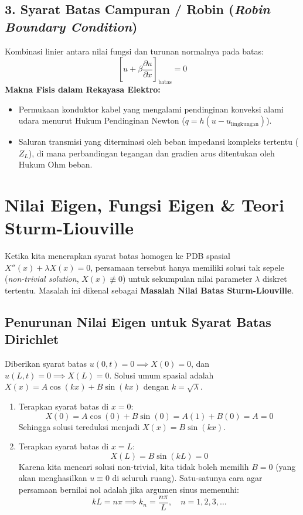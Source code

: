 \documentclass[11pt,a4paper]{article}
\theoremstyle{definition}
\begin{document}
\subsection{3. Syarat Batas Campuran / Robin (\textit{Robin Boundary Condition})}
Kombinasi linier antara nilai fungsi dan turunan normalnya pada batas:
\begin{equation}
    \left[ u + \beta \frac{\partial u}{\partial x} \right]_{\text{batas}} = 0
    \label{eq:bc_robin}
\end{equation}
\textbf{Makna Fisis dalam Rekayasa Elektro:}
\begin{itemize}[leftmargin=*]
    \item Permukaan konduktor kabel yang mengalami pendinginan konveksi alami udara menurut Hukum Pendinginan Newton ($q = h(u - u_{\text{lingkungan}})$).
    \item Saluran transmisi yang diterminasi oleh beban impedansi kompleks tertentu ($Z_L$), di mana perbandingan tegangan dan gradien arus ditentukan oleh Hukum Ohm beban.
\end{itemize}

\section{Nilai Eigen, Fungsi Eigen \& Teori Sturm-Liouville}

Ketika kita menerapkan syarat batas homogen ke PDB spasial $X''(x) + \lambda X(x) = 0$, persamaan tersebut hanya memiliki solusi tak sepele (\textit{non-trivial solution}, $X(x) \not\equiv 0$) untuk sekumpulan nilai parameter $\lambda$ diskret tertentu. Masalah ini dikenal sebagai \textbf{Masalah Nilai Batas Sturm-Liouville}.

\subsection{Penurunan Nilai Eigen untuk Syarat Batas Dirichlet}
Diberikan syarat batas $u(0, t) = 0 \implies X(0) = 0$, dan $u(L, t) = 0 \implies X(L) = 0$.
Solusi umum spasial adalah $X(x) = A \cos(kx) + B \sin(kx)$ dengan $k = \sqrt{\lambda}$.
\begin{enumerate}[leftmargin=*]
    \item Terapkan syarat batas di $x = 0$:
    \begin{equation*}
        X(0) = A \cos(0) + B \sin(0) = A(1) + B(0) = A = 0
    \end{equation*}
    Sehingga solusi tereduksi menjadi $X(x) = B \sin(kx)$.
    \item Terapkan syarat batas di $x = L$:
    \begin{equation*}
        X(L) = B \sin(kL) = 0
    \end{equation*}
    Karena kita mencari solusi non-trivial, kita tidak boleh memilih $B = 0$ (yang akan menghasilkan $u \equiv 0$ di seluruh ruang). Satu-satunya cara agar persamaan bernilai nol adalah jika argumen sinus memenuhi:
    \begin{equation}
        k L = n \pi \implies k_n = \frac{n \pi}{L}, \quad n = 1, 2, 3, \dots
        \label{eq:wave_number_n}
    \end{equation}
\end{enumerate}
\end{document}
